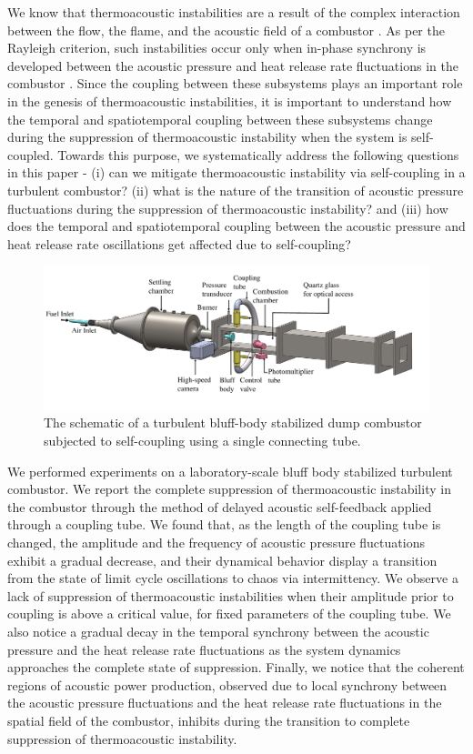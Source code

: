 \documentclass[twocolumn,10pt]{article} %
\begin{document}
We know that thermoacoustic instabilities are a result of the complex interaction between the flow, the flame, and the acoustic field of a combustor \cite{sujith2021thermoacoustic}. As per the Rayleigh criterion, such instabilities occur only when in-phase synchrony is developed between the acoustic pressure and heat release rate fluctuations in the combustor \cite{rayleigh1878explanation}. Since the coupling between these subsystems plays an important role in the genesis of thermoacoustic instabilities, it is important to understand how the temporal and spatiotemporal coupling between these subsystems change during the suppression of thermoacoustic instability when the system is self-coupled. Towards this purpose, we systematically address the following questions in this paper - (i) can we mitigate thermoacoustic instability via self-coupling in a turbulent combustor? (ii) what is the nature of the transition of acoustic pressure fluctuations during the suppression of thermoacoustic instability? and (iii) how does the temporal and spatiotemporal coupling between the acoustic pressure and heat release rate oscillations get affected due to self-coupling? 
\begin{figure}[t]
\centering
\includegraphics[width=1\textwidth]{fig1.pdf}
\caption{The schematic of a turbulent bluff-body stabilized dump combustor subjected to self-coupling using a single connecting tube.}
\label{TARA_fig}
\end{figure}

We performed experiments on a laboratory-scale bluff body stabilized turbulent combustor. We report the complete suppression of thermoacoustic instability in the combustor through the method of delayed acoustic self-feedback applied through a coupling tube. We found that, as the length of the coupling tube is changed, the amplitude and the frequency of acoustic pressure fluctuations exhibit a gradual decrease, and their dynamical behavior display a transition from the state of limit cycle oscillations to chaos via intermittency. We observe a lack of suppression of thermoacoustic instabilities when their amplitude prior to coupling is above a critical value, for fixed parameters of the coupling tube. We also notice a gradual decay in the temporal synchrony between the acoustic pressure and the heat release rate fluctuations as the system dynamics approaches the complete state of suppression. Finally, we notice that the coherent regions of acoustic power production, observed due to local synchrony between the acoustic pressure fluctuations and the heat release rate fluctuations in the spatial field of the combustor, inhibits during the transition to complete suppression of thermoacoustic instability.
\end{document}
